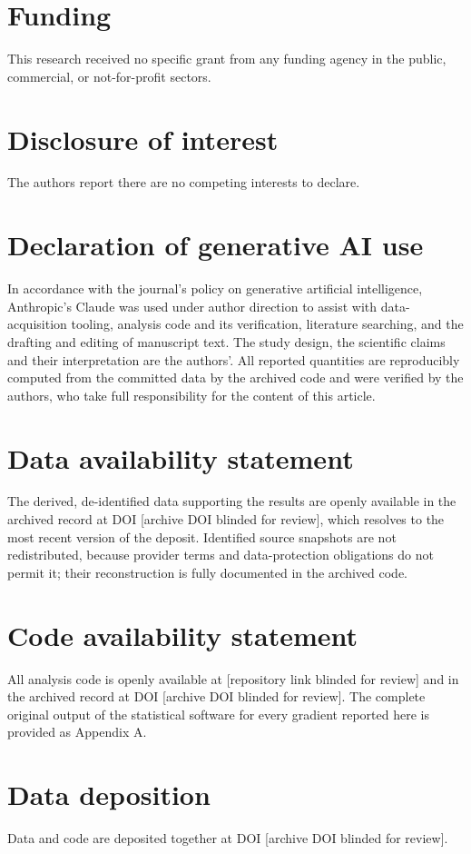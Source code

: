 \documentclass[11pt]{article}
\newcommand{\repositorylink}{[repository link blinded for review]}
\newcommand{\archivedoi}{[archive DOI blinded for review]}
\newcommand{\repositorylink}{\url{https://github.com/Gustolandia/football-denominator-gradient}}
\newcommand{\archivedoi}{10.5281/zenodo.21940596}
\begin{document}
\section*{Funding}
This research received no specific grant from any funding agency in the public, commercial, or not-for-profit sectors.

\section*{Disclosure of interest}
The authors report there are no competing interests to declare.

\section*{Declaration of generative AI use}
In accordance with the journal's policy on generative artificial intelligence, Anthropic's Claude was used under author direction to assist with data-acquisition tooling, analysis code and its verification, literature searching, and the drafting and editing of manuscript text. The study design, the scientific claims and their interpretation are the authors'. All reported quantities are reproducibly computed from the committed data by the archived code and were verified by the authors, who take full responsibility for the content of this article.

\section*{Data availability statement}
The derived, de-identified data supporting the results are openly available in the archived record at DOI \archivedoi{}, which resolves to the most recent version of the deposit. Identified source snapshots are not redistributed, because provider terms and data-protection obligations do not permit it; their reconstruction is fully documented in the archived code.

\section*{Code availability statement}
All analysis code is openly available at \repositorylink{} and in the archived record at DOI \archivedoi{}. The complete original output of the statistical software for every gradient reported here is provided as Appendix A.

\section*{Data deposition}
Data and code are deposited together at DOI \archivedoi{}.
\end{document}
